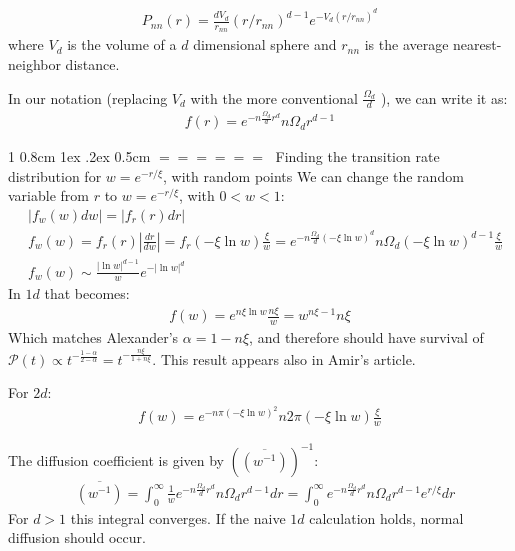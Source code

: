 \documentclass[onecolumn,fleqn,notitlepage,secnumarabic]{revtex4}
\makeatletter
\newenvironment{fminipage}%
  {\begin{Sbox}\begin{minipage}}%
  {\end{minipage}\end{Sbox}\fbox{\TheSbox}}
\def\section{%
  \@startsection
    {section}%
    {1}%
    {\z@}%
    {0.8cm \@plus1ex \@minus .2ex}%
    {0.5cm}%
    {\Large\bf $=\!=\!=\!=\!=\!=\;$}%
}%
\makeatother
\begin{document}
\begin{fminipage}{\textwidth}
\begin{align}P_{nn}(r)=\frac{d
V_d}{r_{nn}} {(r/r_{nn})}^{d-1} e^{-V_d {(r/r_{nn})}^d}\end{align} 
where $V_d$ is the volume of a $d$ dimensional sphere and $r_{nn}$ is the
average nearest-neighbor distance.
\end{fminipage}

In our notation (replacing $V_d$ with the more conventional $\frac{\Omega_d}{d}$ ), we can write it as:
\begin{align} f(r) = e^{-n \frac{\Omega_d}{d} r^d} n\Omega_d r^{d-1} \end{align}

\section{Finding the transition rate distribution for $w= e^{-r/ \xi}$, with random points}
We can change the random variable from $r$ to $w= e^{-r/ \xi}$, with $0<w<1$:
\begin{align}
    &|f_w(w)dw| = |f_r(r)dr| \\
    &f_w(w) = f_r(r)\left|\frac{dr}{dw}\right| = f_r(-\xi \ln w)\frac{\xi}{w} = e^{-n \frac{\Omega_d}{d} (-\xi\ln w)^d} n\Omega_d (-\xi\ln w)^{d-1}\frac{\xi}{w} \\
    &f_w(w) \sim \frac{|\ln w|^{d-1}}{w} e^{-|\ln w|^d}
\end{align}
In $1d$ that becomes:
\begin{align} f(w)= e^{n \xi\ln w} \frac{n\xi}{w} = w^{n\xi-1}n\xi\end{align}
Which matches Alexander's $\alpha = 1-n\xi$, and therefore should have survival of $\mathcal{P}(t)\propto t^{-\frac{1-\alpha}{2-\alpha}}= t^{-\frac{n\xi}{1+n\xi}}$. This result appears also in Amir's article.



For $2d$:
\begin{align} f(w) = e^{-n \pi (-\xi\ln w)^2} n 2\pi  (-\xi\ln w)\frac{\xi}{w}\end{align}

The diffusion coefficient is given by $\left(\overline{(w^{-1})}\right)^{-1}$:
\begin{align}
    & \overline{(w^{-1})} = \int_0^\infty \frac{1}{w} e^{-n \frac{\Omega_d}{d} r^d} n\Omega_d r^{d-1} dr = \int_0^\infty e^{-n \frac{\Omega_d}{d} r^d} n\Omega_d r^{d-1}e^{r/\xi} dr 
\end{align}
For $d>1$ this integral converges. If the naive $1d$ calculation holds, normal diffusion should occur.
\end{document}
